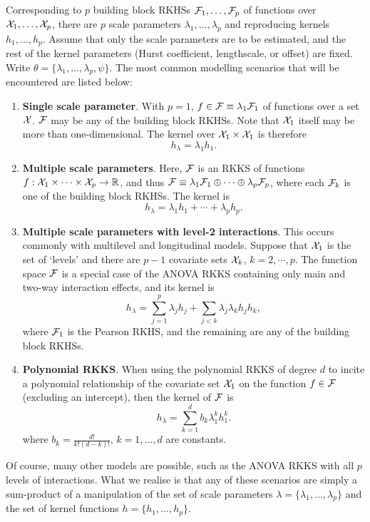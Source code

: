 Corresponding to $p$ building block RKHSs ${\mathcal F}_1,\dots,{\mathcal F}_p$ of functions over ${\mathcal X}_1,\dots,{\mathcal X}_p$, there are $p$ scale parameters $\lambda_1,\dots,\lambda_p$ and reproducing kernels $h_1,\dots,h_p$.
Assume that only the scale parameters are to be estimated, and the rest of the kernel parameters (Hurst coefficient, lengthscale, or offset) are fixed.
Write $\theta = \{\lambda_1,\dots,\lambda_p,\psi\}$.
The most common modelling scenarios that will be encountered are listed below:
\begin{enumerate}
  \item \textbf{Single scale parameter}. With $p=1$, $f\in{\mathcal F}\equiv \lambda_1{\mathcal F}_1$ of functions over a set ${\mathcal X}$. ${\mathcal F}$ may be any of the building block RKHSs. Note that ${\mathcal X}_1$ itself may be more than one-dimensional. The kernel over ${\mathcal X}_1\times{\mathcal X}_1$ is therefore
  \[
    h_\lambda = \lambda_1 h_1.
  \]
  \item \textbf{Multiple scale parameters}. Here, ${\mathcal F}$ is an RKKS of functions $f:{\mathcal X}_1\times\cdots\times{\mathcal X}_p\to\mathbb{R}$, and thus ${\mathcal F}\equiv \lambda_1{\mathcal F}_1 \oplus \cdots \oplus \lambda_p{\mathcal F}_p$, where each ${\mathcal F}_k$ is one of the building block RKHSs. The kernel is
  \[
    h_\lambda = \lambda_1 h_1 + \cdots + \lambda_p h_p.
  \]
  \item \textbf{Multiple scale parameters with level-2 interactions}. This occurs commonly with multilevel and longitudinal models. Suppose that ${\mathcal X}_1$ is the set of `levels' and there are $p-1$ covariate sets ${\mathcal X}_k$, $k=2,\cdots,p$. The function space ${\mathcal F}$ is a special case of the ANOVA RKKS containing only main and two-way interaction effects, and its kernel is
  \[
    h_\lambda = \sum_{j=1}^p \lambda_j h_j + \sum_{j < k} \lambda_j\lambda_k h_j h_k,
  \]
  where ${\mathcal F}_1$ is the Pearson RKHS, and the remaining are any of the building block RKHSs.
  \item \textbf{Polynomial RKKS}. When using the polynomial RKKS of degree $d$ to incite a polynomial relationship of the covariate set ${\mathcal X}_1$ on the function $f\in{\mathcal F}$ (excluding an intercept), then the kernel of ${\mathcal F}$ is
  \[
    h_\lambda = \sum_{k=1}^d b_k \lambda_1^k h_1^k.
  \]
  where $b_k = \frac{d!}{k!(d-k)!}$, $k=1,\dots,d$ are constants.
\end{enumerate}
Of course, many other models are possible, such as the ANOVA RKKS with all $p$ levels of interactions.
What we realise is that any of these scenarios are simply a sum-product of a manipulation of the set of scale parameters $\lambda = \{\lambda_1,\dots,\lambda_p\}$ and the set of kernel functions $h = \{h_1,\dots,h_p\}$.

